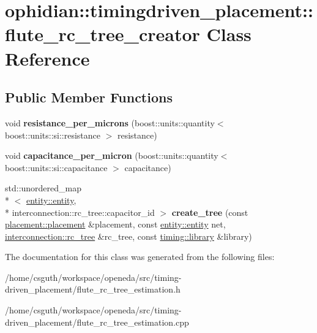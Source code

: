 \hypertarget{classophidian_1_1timingdriven__placement_1_1flute__rc__tree__creator}{\section{ophidian\-:\-:timingdriven\-\_\-placement\-:\-:flute\-\_\-rc\-\_\-tree\-\_\-creator Class Reference}
\label{classophidian_1_1timingdriven__placement_1_1flute__rc__tree__creator}
}
\subsection*{Public Member Functions}
\begin{DoxyCompactItemize}
\item 
\hypertarget{classophidian_1_1timingdriven__placement_1_1flute__rc__tree__creator_a83535cfa2b8c12154515584aeb6bff6e}{void {\bfseries resistance\-\_\-per\-\_\-microns} (boost\-::units\-::quantity$<$ boost\-::units\-::si\-::resistance $>$ resistance)}\label{classophidian_1_1timingdriven__placement_1_1flute__rc__tree__creator_a83535cfa2b8c12154515584aeb6bff6e}

\item 
\hypertarget{classophidian_1_1timingdriven__placement_1_1flute__rc__tree__creator_a8f7b73a96e1f6e98bf4b5f045c541b9c}{void {\bfseries capacitance\-\_\-per\-\_\-micron} (boost\-::units\-::quantity$<$ boost\-::units\-::si\-::capacitance $>$ capacitance)}\label{classophidian_1_1timingdriven__placement_1_1flute__rc__tree__creator_a8f7b73a96e1f6e98bf4b5f045c541b9c}

\item 
\hypertarget{classophidian_1_1timingdriven__placement_1_1flute__rc__tree__creator_a3fc2dbc9e66b5c33132f774045bbd065}{std\-::unordered\-\_\-map\\*
$<$ \hyperlink{classophidian_1_1entity_1_1entity}{entity\-::entity}, \\*
interconnection\-::rc\-\_\-tree\-::capacitor\-\_\-id $>$ {\bfseries create\-\_\-tree} (const \hyperlink{classophidian_1_1placement_1_1placement}{placement\-::placement} \&placement, const \hyperlink{classophidian_1_1entity_1_1entity}{entity\-::entity} net, \hyperlink{classophidian_1_1interconnection_1_1rc__tree}{interconnection\-::rc\-\_\-tree} \&rc\-\_\-tree, const \hyperlink{classophidian_1_1timing_1_1library}{timing\-::library} \&library)}\label{classophidian_1_1timingdriven__placement_1_1flute__rc__tree__creator_a3fc2dbc9e66b5c33132f774045bbd065}

\end{DoxyCompactItemize}


The documentation for this class was generated from the following files\-:\begin{DoxyCompactItemize}
\item 
/home/csguth/workspace/openeda/src/timing-\/driven\-\_\-placement/flute\-\_\-rc\-\_\-tree\-\_\-estimation.\-h\item 
/home/csguth/workspace/openeda/src/timing-\/driven\-\_\-placement/flute\-\_\-rc\-\_\-tree\-\_\-estimation.\-cpp\end{DoxyCompactItemize}

